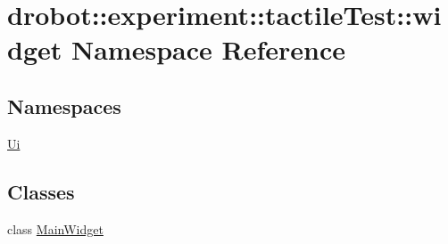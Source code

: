 \hypertarget{namespacedrobot_1_1experiment_1_1tactileTest_1_1widget}{\section{drobot\-:\-:experiment\-:\-:tactile\-Test\-:\-:widget Namespace Reference}
\label{namespacedrobot_1_1experiment_1_1tactileTest_1_1widget}
}
\subsection*{Namespaces}
\begin{DoxyCompactItemize}
\item 
\hyperlink{namespacedrobot_1_1experiment_1_1tactileTest_1_1widget_1_1Ui}{Ui}
\end{DoxyCompactItemize}
\subsection*{Classes}
\begin{DoxyCompactItemize}
\item 
class \hyperlink{classdrobot_1_1experiment_1_1tactileTest_1_1widget_1_1MainWidget}{Main\-Widget}
\end{DoxyCompactItemize}
